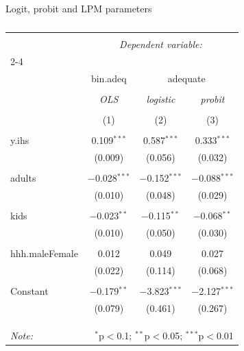\documentclass[
  ignorenonframetext,
]{beamer}
\begin{document}
\begin{frame}{Logit, probit and LPM parameters}
\protect{}\label{logit-probit-and-lpm-parameters}
\tiny

\begin{table}[!htbp] \centering 
  \caption{} 
  \label{} 
\begin{tabular}{@{\extracolsep{5pt}}lccc} 
\\[-1.8ex]\hline 
\hline \\[-1.8ex] 
 & \multicolumn{3}{c}{\textit{Dependent variable:}} \\ 
\cline{2-4} 
\\[-1.8ex] & bin.adeq & \multicolumn{2}{c}{adequate} \\ 
\\[-1.8ex] & \textit{OLS} & \textit{logistic} & \textit{probit} \\ 
\\[-1.8ex] & (1) & (2) & (3)\\ 
\hline \\[-1.8ex] 
 y.ihs & 0.109$^{***}$ & 0.587$^{***}$ & 0.333$^{***}$ \\ 
  & (0.009) & (0.056) & (0.032) \\ 
  & & & \\ 
 adults & $-$0.028$^{***}$ & $-$0.152$^{***}$ & $-$0.088$^{***}$ \\ 
  & (0.010) & (0.048) & (0.029) \\ 
  & & & \\ 
 kids & $-$0.023$^{**}$ & $-$0.115$^{**}$ & $-$0.068$^{**}$ \\ 
  & (0.010) & (0.050) & (0.030) \\ 
  & & & \\ 
 hhh.maleFemale & 0.012 & 0.049 & 0.027 \\ 
  & (0.022) & (0.114) & (0.068) \\ 
  & & & \\ 
 Constant & $-$0.179$^{**}$ & $-$3.823$^{***}$ & $-$2.127$^{***}$ \\ 
  & (0.079) & (0.461) & (0.267) \\ 
  & & & \\ 
\hline \\[-1.8ex] 
\hline 
\hline \\[-1.8ex] 
\textit{Note:}  & \multicolumn{3}{r}{$^{*}$p$<$0.1; $^{**}$p$<$0.05; $^{***}$p$<$0.01} \\ 
\end{tabular} 
\end{table}

\normalsize
\end{frame}
\end{document}
